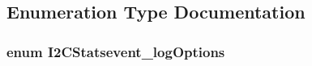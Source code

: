 \subsection{\-Enumeration \-Type \-Documentation}
\hypertarget{group___i2_c_stats_gae803cac254ef7e0b2d08ebcc3578241a}{
\subsubsection[{\-I2\-C\-Statsevent\-\_\-log\-Options}]{\setlength{\rightskip}{0pt plus 5cm}enum {\bf \-I2\-C\-Statsevent\-\_\-log\-Options}}}\label{group___i2_c_stats_gae803cac254ef7e0b2d08ebcc3578241a}
